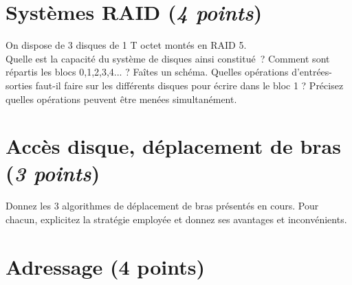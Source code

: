 \documentclass[11pt]{article}
\newcounter{cq}
\begin{document}
\section{Systèmes RAID (\emph{4 points})}\vspace{-0.4cm}
\vspace{-0.3cm}

On dispose de 3 disques de 1 T octet montés en RAID 5.\\
Quelle est la capacité du système de disques ainsi constitué~? Comment sont répartis les blocs 0,1,2,3,4... ?
Faîtes un schéma. 
\newpage
Quelles opérations d'entrées-sorties faut-il faire sur les différents disques pour écrire dans le bloc 1 ? Précisez quelles opérations peuvent être menées
simultanément.

\vspace{-0.4cm}
\section{Accès disque, déplacement de bras (\emph{3 points})}
\vspace{-0.4cm}
Donnez les 3 algorithmes de déplacement de bras présentés en cours. 
Pour chacun, explicitez la stratégie employée et donnez ses avantages et inconvénients.
  
\vspace{-0.4cm}
\section{Adressage (4 points)}
\vspace{-0.4cm}
\end{document}
